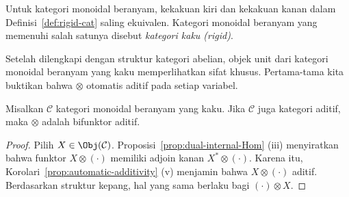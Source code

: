 \begin{definition}\label{def:rigid-cat-braided}
	Untuk kategori monoidal beranyam, kekakuan kiri dan kekakuan kanan dalam
	Definisi~\ref{def:rigid-cat} saling ekuivalen. Kategori monoidal beranyam
	yang memenuhi salah satunya disebut \emph{kategori kaku (rigid)}.
\end{definition}

Setelah dilengkapi dengan struktur kategori abelian, objek unit dari kategori
monoidal beranyam yang kaku memperlihatkan sifat khusus. Pertama-tama kita
buktikan bahwa $\otimes$ otomatis aditif pada setiap variabel.

\begin{proposition}\label{prop:rigid-additive}
	Misalkan $\mathcal{C}$ kategori monoidal beranyam yang kaku. Jika
	$\mathcal{C}$ juga kategori aditif, maka $\otimes$ adalah bifunktor aditif.
\end{proposition}
\begin{proof}
	Pilih $X\in\Obj(\mathcal{C})$. Proposisi~\ref{prop:dual-internal-Hom}
	(iii) menyiratkan bahwa funktor $X\otimes(\cdot)$ memiliki adjoin kanan
$X^*\otimes(\cdot)$. Karena itu, Korolari~\ref{prop:automatic-additivity}
(v) menjamin bahwa $X\otimes(\cdot)$ aditif. Berdasarkan struktur kepang,
hal yang sama berlaku bagi $(\cdot)\otimes X$.
\end{proof}

